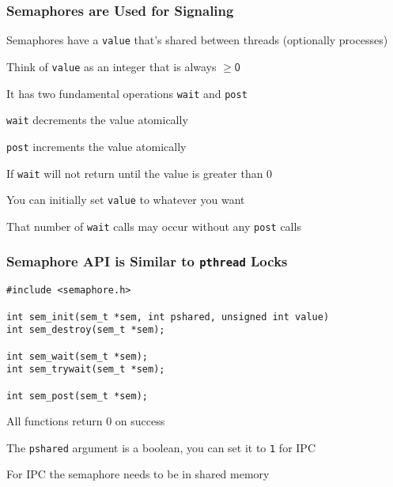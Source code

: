   \begin{frame}[fragile]
    \frametitle{Semaphores are Used for Signaling}

    Semaphores have a {\tt value} that's shared between threads (optionally
    processes)

    \hspace{2em} Think of {\tt value} as an integer that is always $\mathsf{\geq 0}$

    \vspace{2em}

    It has two fundamental operations {\tt wait} and {\tt post}

    \hspace{2em} \texttt{wait} decrements the value atomically

    \hspace{2em} \texttt{post} increments the value atomically

    \vspace{2em}

    If \texttt{wait} will not return until the value is greater than 0

    \vspace{2em}

    You can initially set \texttt{value} to whatever you want

    \hspace{2em} That number of \texttt{wait} calls may occur without any \texttt{post} calls
  \end{frame}

  \begin{frame}[fragile]
    \frametitle{Semaphore API is Similar to \texttt{pthread} Locks}
  
    \begin{lstlisting}
#include <semaphore.h>

int sem_init(sem_t *sem, int pshared, unsigned int value)
int sem_destroy(sem_t *sem);

int sem_wait(sem_t *sem);
int sem_trywait(sem_t *sem);

int sem_post(sem_t *sem);
    \end{lstlisting}

    \vspace{2em}

    All functions return 0 on success

    \vspace{2em}

    The \texttt{pshared} argument is a boolean, you can set it to \texttt{1} for
    IPC

    \hspace{2em} For IPC the semaphore needs to be in shared memory
  \end{frame}

